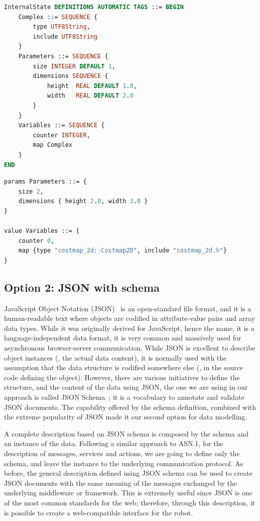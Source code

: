 \begin{lstlisting}[language=ASN1,caption={Internal state of a node modelled using ASN.1},label=lst:asn1-ros-is]
InternalState DEFINITIONS AUTOMATIC TAGS ::= BEGIN
	Complex ::= SEQUENCE {
		type UTF8String,
		include UTF8String
	}
	Parameters ::= SEQUENCE {
		size INTEGER DEFAULT 1,
		dimensions SEQUENCE {
			height	REAL DEFAULT 1.0,
			width	REAL DEFAULT 2.0
		}
	}
	Variables ::= SEQUENCE {
		counter INTEGER,
		map Complex
	}
END
\end{lstlisting}

\begin{lstlisting}[language=ASN1,caption={Internal state instance defined in ASN.1},label=lst:asn1-ros-is1]
params Parameters ::= {
	size 2, 
	dimensions { height 2.0, width 3.0 }
}

value Variables ::= { 
	counter 0,
	map {type "costmap_2d::Costmap2D", include "costmap_2d.h"}
}
\end{lstlisting}
 
\subsection{Option 2: JSON with schema}
 JavaScript Object Notation (JSON)~\cite{crockford2006application} is an open-standard file format, and it is a human-readable text where objects are codified in attribute-value pairs and array data types. While it was originally derived for JavaScript, hence the name, it is a language-independent data format, it is very common and massively used for asynchronous browser-server communication. While JSON is excellent to describe object instances (\ie, the actual data content), it is normally used with the assumption that the data structure is codified somewhere else (\eg, in the source code defining the object). However, there are various initiatives to define the structure, and the content of the data using JSON, the one we are using in our approach is called JSON Schema~\cite{pezoa2016foundations}; it is a vocabulary to annotate and validate JSON documents. The capability offered by the schema definition, combined with the extreme popularity of JSON made it our second option for data modelling.
 
A complete description based on JSON schema is composed by the schema and an instance of the data. Following a similar approach to ASN.1, for the description of messages, services and actions, we are going to define only the schema, and leave the instance to the underlying communication protocol. As before, the general description defined using JSON schema can be used to create JSON documents with the same meaning of the messages exchanged by the underlying middleware or framework. This is extremely useful since JSON is one of the most common standards for the web; therefore, through this description, it is possible to create a web-compatible interface for the robot. 

